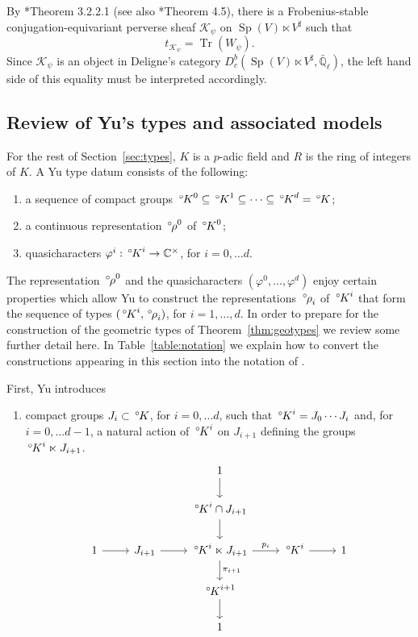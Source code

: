 \documentclass[10pt]{amsart}
\makeatletter
\theoremstyle{plain}
\theoremstyle{definition}
\newcommand{\CC}{{\mathbb{C}}}
\newcommand{\EE}{\mathbb{\bar Q}_\ell}
\DeclareMathOperator{\trace}{Tr}
\newcommand{\trFrob}[1]{t_{#1}}
\newcommand{\cs}[1]{{\mathcal{#1}}}
\newcommand{\labitem}[2]{
\def\@itemlabel{\textbf{#1}}
\item
\def\@currentlabel{#1}\label{#2}}
\newcommand{\Sp}{{\operatorname{Sp}}}
\newcommand{\oK}{{\,^\circ \hskip-1pt K}}
\newcommand{\orho}{{\,^\circ \hskip-1pt \rho}}
\makeatother
\begin{document}
By \cite{gurevich-hadani:07a}*{Theorem 3.2.2.1} (see also \cite{gurevich-hadani:11a}*{Theorem 4.5}), there is a Frobenius-stable conjugation-equivariant perverse sheaf $\cs{K}_\psi$ on $\Sp(V)\ltimes V^\sharp$  such that 
\begin{equation}\label{eqn:Jacobi}
\trFrob{\cs{K}_\psi} = \trace(W_\psi).
\end{equation}
%
Since $\cs{K}_\psi$ is an object in Deligne's category $D^b_c(\Sp(V)\ltimes V^\sharp,\EE)$, the left hand side of this equality must be interpreted accordingly.

\subsection{Review of Yu's types and associated models}\label{ssec:review}

For the rest of Section~\ref{sec:types}, $K$ is a $p$-adic field and $R$ is the ring of integers of $K$.
A Yu type datum consists of the following:
\begin{enumerate}
\labitem{Y0}{Y0} a sequence of compact groups $\oK^0 \subseteq \oK^1 \subseteq \cdots \subseteq \oK^d = \oK$;
\labitem{Y1}{Y1} a continuous representation $\orho^0$ of $\oK^0$;
\labitem{Y2}{Y2} quasicharacters $\varphi^i : \oK^i \to \CC^\times$, for $i=0, \ldots d$.
\end{enumerate}
The representation $\orho^0$ and the quasicharacters $(\varphi^0, \ldots , \varphi^d)$ enjoy certain properties which allow Yu to construct the representations $\orho_i$ of $\oK^i$ that form the sequence of types $(\oK^i,\orho_i)$, for $i=1, \ldots, d$.
%
In order to prepare for the construction of the geometric types of Theorem~\ref{thm:geotypes}  we review some further detail here.
In Table~\ref{table:notation} we explain how to convert the constructions appearing in this section into the notation of \cite{yu:01a}.


First, Yu introduces 
\begin{enumerate}
\labitem{Y3}{Y3}
compact groups $J_i\subset \oK$, for $i=0, \ldots d$, such that 
$
\oK^i = J_0\cdots J_{i}
$ 
and, for $i=0, \ldots d-1$, a natural action of $\oK^i$ on $J_{i+1}$ defining the groups $\oK^i \ltimes J_{i+1}$.
\begin{equation}\label{eq:semiprod}
\begin{tikzcd}
\ && 1 \arrow{d} && \\
\ && \oK^{i}\cap J_{i+1}\arrow{d} && \\
1 \arrow{r} & J_{i+1} \arrow{r} & \oK^i \ltimes J_{i+1} \arrow{d}{\pi_{i+1}} \arrow{r}{p_i} & \oK^i \arrow{r} & 1\\
&& \oK^{i+1} \arrow{d}{} && \\
&& 1 &&
\end{tikzcd}
\end{equation}
\end{enumerate}
%
\end{document}
